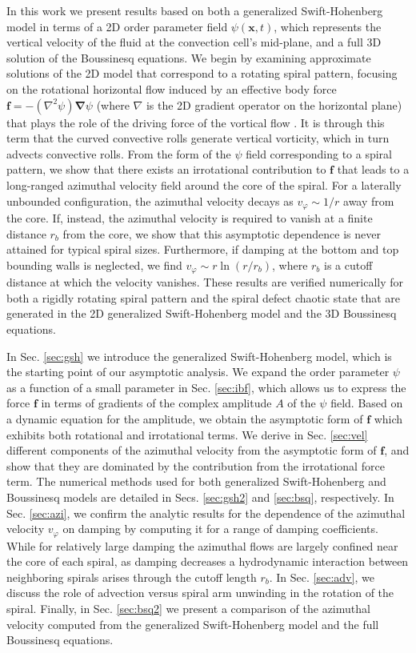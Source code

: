 \documentclass[preprint,prx,floatfix]{revtex4-1}
\begin{document}
In this work we present results based on both a generalized Swift-Hohenberg model in terms of a 2D order parameter field $\psi(\mathbf{x},t)$, which represents the vertical velocity of the fluid at the convection cell's mid-plane, and a full 3D solution of the Boussinesq equations. We begin by examining approximate solutions of the 2D model that correspond to a rotating spiral pattern, focusing on the rotational horizontal flow induced by an effective body force $\mathbf{f} = -(\nabla^2\psi){\bm \nabla}\psi$ (where $\nabla$ is the 2D gradient operator on the horizontal plane) that plays the role of the driving force of the vortical flow \cite{xi1993spiral,cross1996theoretical}. It is through this term that the curved convective rolls generate vertical vorticity, which in turn advects convective rolls. From the form of the $\psi$ field corresponding to a spiral pattern, we show that there exists an irrotational contribution to $\mathbf{f}$ that leads to a long-ranged azimuthal velocity field around the core of the spiral. For a laterally unbounded configuration, the azimuthal velocity decays as $v_{\varphi} \sim 1/r$ away from the core. If, instead, the azimuthal velocity is required to vanish at a finite distance $r_{b}$ from the core, we show that this asymptotic dependence is never attained for typical spiral sizes. Furthermore, if damping at the bottom and top bounding walls is neglected, we find $v_{\varphi} \sim r \ln (r/r_b)$, where $r_{b}$ is a cutoff distance at which the velocity vanishes. These results are verified numerically for both a rigidly rotating spiral pattern and the spiral defect chaotic state that are generated in the 2D generalized Swift-Hohenberg model and the 3D Boussinesq equations. 

In Sec. \ref{sec:gsh} we introduce the generalized Swift-Hohenberg model, which is the starting point of our asymptotic analysis. We expand the order parameter $\psi$ as a function of a small parameter in Sec. \ref{sec:ibf}, which allows us to express the force $\mathbf{f}$ in terms of gradients of the complex amplitude $A$ of the $\psi$ field. Based on a dynamic equation for the amplitude, we obtain the asymptotic form of $\mathbf{f}$ which exhibits both rotational and irrotational terms. We derive in Sec. \ref{sec:vel} different components of the azimuthal velocity from the asymptotic form of $\mathbf{f}$, and show that they are dominated by the contribution from the irrotational force term. The numerical methods used for both generalized Swift-Hohenberg and Boussinesq models are detailed in Secs. \ref{sec:gsh2} and \ref{sec:bsq}, respectively. In Sec. \ref{sec:azi}, we confirm the analytic results for the dependence of the azimuthal velocity $v_{\varphi}$ on damping by computing it  for a range of damping coefficients. While for relatively large damping the azimuthal flows are largely confined near the core of each spiral, as damping decreases a hydrodynamic interaction between neighboring spirals arises through the cutoff length $r_{b}$.  In Sec. \ref{sec:adv}, we discuss the role of advection versus spiral arm unwinding in the rotation of the spiral. Finally, in Sec. \ref{sec:bsq2} we present a comparison of the azimuthal velocity computed from the generalized Swift-Hohenberg model and the full Boussinesq equations.
\end{document}
